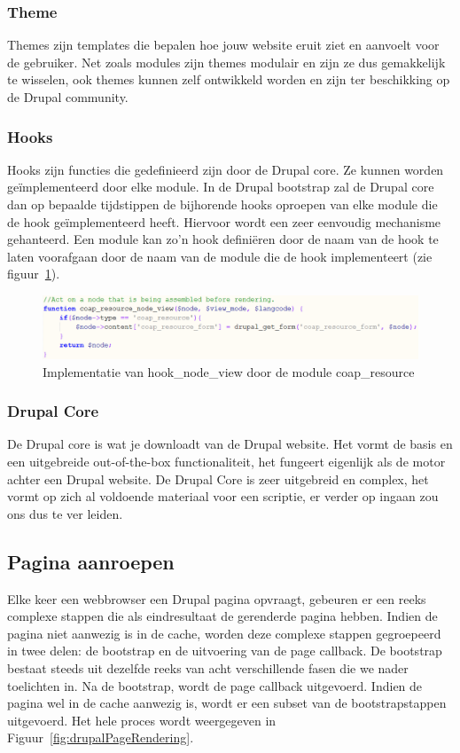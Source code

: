\subsubsection{Theme}
Themes zijn templates die bepalen hoe jouw website eruit ziet en aanvoelt voor de gebruiker. Net zoals modules zijn themes modulair en zijn ze dus gemakkelijk te wisselen, ook themes kunnen zelf ontwikkeld worden en zijn ter beschikking op de Drupal community.

\subsubsection{Hooks}
Hooks zijn functies die gedefinieerd zijn door de Drupal core. Ze kunnen worden ge\"{i}mplementeerd door elke module. In de Drupal bootstrap zal de Drupal core dan op bepaalde tijdstippen de bijhorende hooks oproepen van elke module die de hook ge\"{i}mplementeerd heeft. Hiervoor wordt een zeer eenvoudig mechanisme gehanteerd. Een module kan zo'n hook defini\"{e}ren door de naam van de hook te laten voorafgaan door de naam van de module die de hook implementeert (zie figuur~\ref{fig:drupalHookExample}).
\begin{figure}[h]
\includegraphics[width=1\textwidth]{fig/drupalHookExample}
\caption{Implementatie van hook\_node\_view door de module coap\_resource}
\label{fig:drupalHookExample}
\end{figure}

\subsubsection{Drupal Core}
De Drupal core is wat je downloadt van de Drupal website. Het vormt de basis en een uitgebreide out-of-the-box functionaliteit, het fungeert eigenlijk als de motor achter een Drupal website. De Drupal Core is zeer uitgebreid en complex, het vormt op zich al voldoende materiaal voor een scriptie, er verder op ingaan zou ons dus te ver leiden. %

\subsection{Pagina aanroepen}
Elke keer een webbrowser een Drupal pagina opvraagt, gebeuren er een reeks complexe stappen die als eindresultaat de gerenderde pagina hebben. Indien de pagina niet aanwezig is in de cache, worden deze complexe stappen gegroepeerd in twee delen: de bootstrap en de uitvoering van de page callback. De bootstrap bestaat steeds uit dezelfde reeks van acht verschillende fasen die we nader toelichten in. Na de bootstrap, wordt de page callback uitgevoerd. Indien de pagina wel in de cache aanwezig is, wordt er een subset van de bootstrapstappen uitgevoerd. Het hele proces wordt weergegeven in Figuur~\ref{fig:drupalPageRendering}. %

